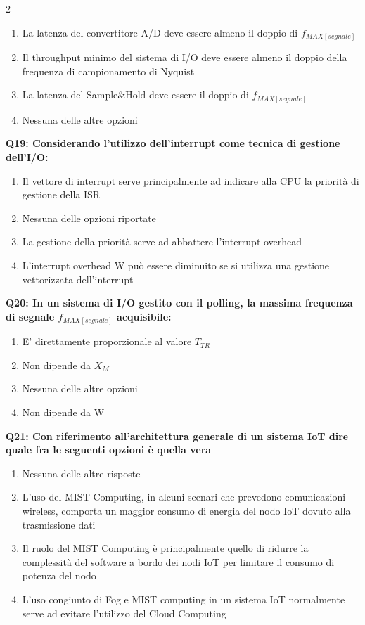 \documentclass[10pt]{article}
\begin{document}
\begin{multicols}{2}
\begin{enumerate}[label=\arabic*.]
\item La latenza del convertitore A/D deve essere almeno il doppio di $f_{MAX[segnale]}$
\item Il throughput minimo del sistema di I/O deve essere almeno il doppio della frequenza di campionamento di Nyquist
\item La latenza del Sample\&Hold deve essere il doppio di $f_{MAX[segnale]}$
\item Nessuna delle altre opzioni
\end{enumerate}
\textbf{Q19: Considerando l’utilizzo dell’interrupt come tecnica di gestione dell’I/O:}

\begin{enumerate}[label=\arabic*.]
\item Il vettore di interrupt serve principalmente ad indicare alla CPU la priorità di gestione della ISR
\item Nessuna delle opzioni riportate
\item La gestione della priorità serve ad abbattere l’interrupt overhead
\item L’interrupt overhead W può essere diminuito se si utilizza una gestione vettorizzata dell’interrupt
\end{enumerate}
\textbf{Q20: In un sistema di I/O gestito con il polling, la massima frequenza di segnale $f_{MAX[segnale]}$ acquisibile:}

\begin{enumerate}[label=\arabic*.]
\item E' direttamente proporzionale al valore $T_{TR}$
\item Non dipende da $X_M$
\item Nessuna delle altre opzioni
\item Non dipende da W
\end{enumerate}
\textbf{Q21: Con riferimento all’architettura generale di un sistema IoT dire quale fra le seguenti opzioni è quella vera}

\begin{enumerate}[label=\arabic*.]
\item Nessuna delle altre risposte
\item L’uso del MIST Computing, in alcuni scenari che prevedono comunicazioni wireless, comporta un maggior consumo di energia del nodo IoT dovuto alla trasmissione dati
\item Il ruolo del MIST Computing è principalmente quello di ridurre la complessità del software a bordo dei nodi IoT per limitare il consumo di potenza del nodo
\item L’uso congiunto di Fog e MIST computing in un sistema IoT normalmente serve ad evitare l’utilizzo del Cloud Computing
\end{enumerate}
\end{multicols}
\end{document}

